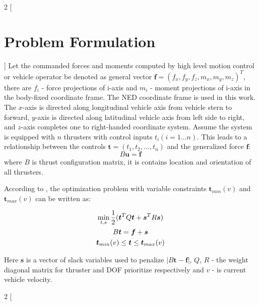 \documentclass[a0,portrait]{a0poster}
\begin{document}
\hfill
\color{SaddleBrown}
\begin{minipage}[t]{0.48\linewidth}
\begin{multicols}{2}
[
\section*{Problem Formulation}
]
Let the commanded forces and moments computed by high level motion control or vehicle operator be denoted as general vector $\boldsymbol{f} = (f_x, f_y, f_z, m_x, m_y, m_z)^T$, there are $f_i$ - force projections of i-axis and $m_i$ - moment projections of i-axis in the body-fixed coordinate frame. The NED  coordinate frame \cite{ned} is used in this work. The $x$-axis is directed along longitudinal vehicle axis from vehicle stern to forward, $y$-axis is directed along latitudinal vehicle axis from left side to right, and $z$-axis completes one to right-handed coordinate system. Assume the system is equipped with $n$ thrusters with control inputs $t_i (i = 1...n)$. This leads to a relationship between the controls $\boldsymbol{t}=(t_1,t_2,...,t_n)$ and the generalized force $\boldsymbol{f}$:
\begin{equation}
	B\boldsymbol{u} = \boldsymbol{f}
\end{equation}
where $B$ is thrust configuration matrix, it is contains location and orientation of all thrusters.

According to \cite{allocation_1}, the optimization problem with variable constraints $\boldsymbol{t}_{min}(v)$ and $\boldsymbol{t}_{max}(v)$ can be written as:

\begin{gather}
	\min\limits_{t,s} \frac{1}{2}(\boldsymbol{t}^TQ\boldsymbol{t}+\boldsymbol{s}^TR\boldsymbol{s}) \notag \\
	B\boldsymbol{t} = \boldsymbol{f} + \boldsymbol{s}\\
	\boldsymbol{t}_{min}(v) \leq \boldsymbol{t} \leq \boldsymbol{t}_{max}(v) \notag
	\label{eq:problem}
\end{gather}

Here $\boldsymbol{s}$ is a vector of slack variables used to penalize $\left|B\boldsymbol{t} - \boldsymbol{f}\right|$, $Q$, $R$ - the weight diagonal matrix for thruster and DOF prioritize respectively and $v$ - is current vehicle velocity.
\end{multicols}

\begin{multicols}{2}
[

\end{multicols}
\end{minipage}
\end{document}
